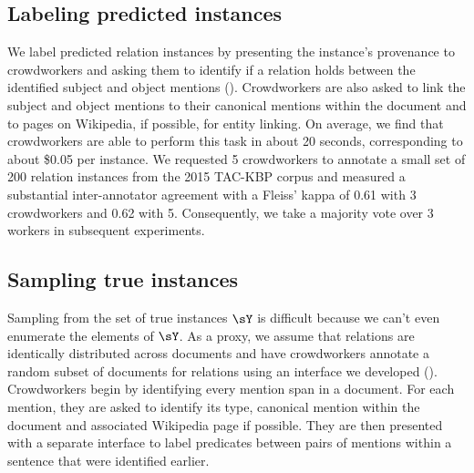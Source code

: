 \subsection{Labeling predicted instances}
We label predicted relation instances by presenting the instance's provenance to crowdworkers
  and asking them to identify if a relation holds between the identified subject and object mentions (). 
  Crowdworkers are also asked to link the subject and object mentions to their canonical mentions within the document and to pages on Wikipedia, if possible, for entity linking.
On average, we find that crowdworkers are able to perform this task in about 20 seconds, corresponding to about \$0.05 per instance.
We requested 5 crowdworkers to annotate a small set of 200 relation instances from the 2015 TAC-KBP corpus 
and measured a substantial inter-annotator agreement with a Fleiss' kappa of 0.61 with 3 crowdworkers and 0.62 with 5. %
Consequently, we take a majority vote over 3 workers in subsequent experiments.

\subsection{Sampling true instances}
Sampling from the set of true instances $\sY$ is difficult because we can't even enumerate the elements of $\sY$.
As a proxy, we assume that relations are identically distributed across documents and have crowdworkers annotate a random subset of documents for relations using an interface we developed ().
Crowdworkers begin by identifying every mention span in a document.
  For each mention, they are asked to identify its type, canonical mention within the document
  and associated Wikipedia page if possible.
They are then presented with a separate interface to label predicates between pairs of mentions within a sentence that were identified earlier.

